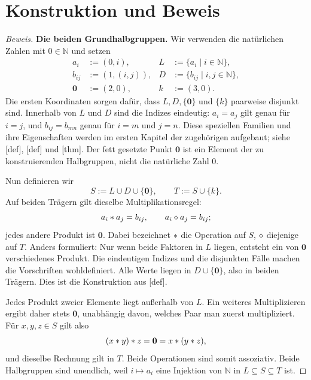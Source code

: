 \section*{Konstruktion und Beweis}
\begin{proof}[Beweis]
\textbf{Die beiden Grundhalbgruppen.}
Wir verwenden die natürlichen Zahlen mit \(0\in\mathbb N\) und setzen
\[
  \begin{aligned}
    a_i&:=(0,i),& L&:=\{a_i\mid i\in\mathbb N\},\\
    b_{ij}&:=(1,(i,j)),&
    D&:=\{b_{ij}\mid i,j\in\mathbb N\},\\
    \mathbf0&:=(2,0),& k&:=(3,0).
  \end{aligned}
\]
Die ersten Koordinaten sorgen dafür, dass \(L,D,\{\mathbf0\}\) und
\(\{k\}\) paarweise disjunkt sind. Innerhalb von \(L\) und \(D\)
sind die Indizes eindeutig: \(a_i=a_j\) gilt genau für \(i=j\),
und \(b_{ij}=b_{mn}\) genau für \(i=m\) und \(j=n\).
Diese speziellen Familien und ihre Eigenschaften werden im ersten
Kapitel der zugehörigen \MogProofsLink{} aufgebaut;
siehe [def],
[def] und
[thm]. Der fett gesetzte
Punkt \(\mathbf0\) ist ein Element der zu konstruierenden Halbgruppen,
nicht die natürliche Zahl \(0\).

Nun definieren wir
\[
  S:=L\cup D\cup\{\mathbf0\},
  \qquad T:=S\cup\{k\}.
\]
Auf beiden Trägern gilt dieselbe Multiplikationsregel:
\[
  a_i\mathbin{\ast} a_j=b_{ij},\qquad
  a_i\mathbin{\diamond} a_j=b_{ij};
\]
jedes andere Produkt ist \(\mathbf0\). Dabei bezeichnet
\(\mathbin{\ast}\) die Operation auf \(S\),
\(\mathbin{\diamond}\) diejenige auf \(T\). Anders formuliert:
Nur wenn beide Faktoren in \(L\) liegen, entsteht ein von
\(\mathbf0\) verschiedenes Produkt. Die eindeutigen Indizes und die
disjunkten Fälle machen die Vorschriften wohldefiniert. Alle Werte
liegen in \(D\cup\{\mathbf0\}\), also in beiden Trägern.
Dies ist die Konstruktion aus
[def].

Jedes Produkt zweier Elemente liegt außerhalb von \(L\). Ein weiteres
Multiplizieren ergibt daher stets \(\mathbf0\), unabhängig davon,
welches Paar man zuerst multipliziert. Für \(x,y,z\in S\) gilt also
\[
  (x\mathbin{\ast} y)\mathbin{\ast} z=\mathbf0
    =x\mathbin{\ast}(y\mathbin{\ast} z),
\]
und dieselbe Rechnung gilt in \(T\). Beide Operationen sind somit
assoziativ. Beide Halbgruppen sind unendlich, weil
\(i\mapsto a_i\) eine Injektion von \(\mathbb N\) in
\(L\subseteq S\subseteq T\) ist.


\end{proof}
